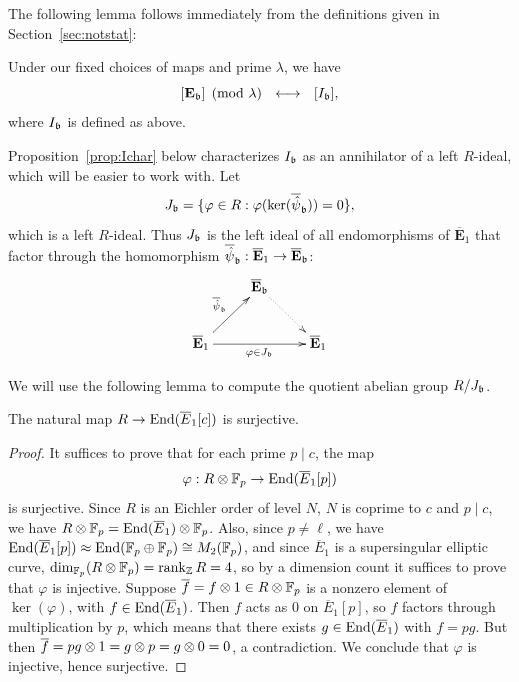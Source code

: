\documentclass{article} \usepackage[active]{srcltx}
\newcommand{\eE}{\mathbf{E}}
\begin{document}
The following lemma follows immediately from the
definitions given in Section~\ref{sec:notstat}:
\begin{lemma}
Under our fixed choices of maps and prime $\lambda$, we have
$$
  [\eE_{\fb}]\pmod{\lambda} \,\,\,\, \longleftrightarrow\,\,\,\, [I_{\fb}],
$$
where $I_{\mathfrak{b}}$ is defined as above. 
\end{lemma}

Proposition~\ref{prop:Ichar} below
characterizes $I_{\mathfrak{b}}$ as an annihilator of a left $R$-ideal,
which will be easier to work with.
Let 
$$
  J_{\mathfrak{b}} = \{\varphi \in  R : \varphi(\ker(\overline{\hat{\psi}}_{\mathfrak{b}})) = 0\},
$$
which is a left $R$-ideal.  Thus $J_{\mathfrak{b}}$ is the left ideal
of all endomorphisms of $\overline{\eE}_1$ that factor through the
homomorphism $\overline{\hat{\psi}}_{\fb}: \overline{\eE}_1 \to \overline{\eE}_\fb$:
$$
\xymatrix{
   & {\overline{\eE}_\fb}\ar@{.>}[dr] & \\
{\overline{\eE}_1} \ar[ur]^{\overline{\hat{\psi}}_{\fb}} \ar[rr]_{\varphi \in J_{\fb}} & & {\overline{\eE}_1}
}
$$

We will use the following lemma to compute the quotient abelian group $R/J_{\mathfrak{b}}$.
\begin{lemma}\label{lem:rsurj}
The natural map $R \to \operatorname{End}(\overline{E}_1[c])$ is surjective.
\end{lemma}
\begin{proof}
It suffices to prove that for each prime $p\mid c$, the map
\begin{equation}\label{eqn:rmodp}
  \varphi: R\otimes \mathbb{F}_p \to \operatorname{End}(\overline{E}_1[p])
\end{equation}
is surjective. 
Since $R$ is an Eichler order of level $N$, $N$ is coprime to $c$
and $p\mid c$,
we have $R\otimes \mathbb{F}_p = \operatorname{End}(\overline{E}_1)\otimes\mathbb{F}_p$.
Also, since $p\neq \ell$, we have
$\operatorname{End}(\overline{E}_1[p]) \approx \operatorname{End}(\mathbb{F}_p\oplus\mathbb{F}_p) \cong M_2(\mathbb{F}_p)$,
and since $\overline{E}_1$ is a supersingular elliptic curve, 
$\dim_{\mathbb{F}_p}(R\otimes\mathbb{F}_p) = \operatorname{rank}_{\mathbb{Z}} R = 4$,
so by a dimension count it suffices to prove 
that $\varphi$ is injective. 
Suppose $\overline{f}=f\otimes 1 \in R\otimes\mathbb{F}_p$ is a
nonzero element of $\ker(\varphi)$, with $f\in \operatorname{End}(\overline{E}_1)$.
Then $f$ acts as $0$ on $\overline{E}_1[p]$, so $f$ factors
through multiplication by $p$, which means that
there exists $g\in \operatorname{End}(\overline{E}_1)$ with
$f = p g$.  But then $\overline{f}=pg\otimes 1 = g\otimes p = g\otimes 0 = 0$, a contradiction. 
We conclude that $\varphi$ is injective, hence surjective.
\end{proof}
\end{document}
